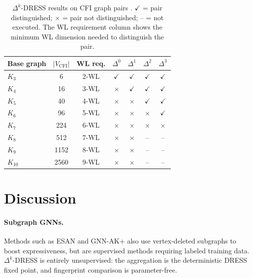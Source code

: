 \documentclass[11pt,a4paper]{article}
\begin{document}
\begin{table}[h]
\centering
\caption{$\Delta^k$-DRESS results on CFI graph pairs \cite{castrillo2026dress}. $\checkmark$ = pair distinguished; $\times$ = pair not distinguished; -- = not executed. The WL requirement column shows the minimum WL dimension needed to distinguish the pair.}
\label{tab:cfi-results}
\begin{tabular}{@{}lcccccc@{}}
\toprule
Base graph & $|V_{\text{CFI}}|$ & WL req. & $\Delta^0$ & $\Delta^1$ & $\Delta^2$ & $\Delta^3$ \\
\midrule
$K_3$   & 6     & 2-WL & $\checkmark$  & $\checkmark$  & $\checkmark$  & $\checkmark$  \\
$K_4$   & 16    & 3-WL & $\times$      & $\checkmark$  & $\checkmark$  & $\checkmark$  \\
$K_5$   & 40    & 4-WL & $\times$      & $\times$      & $\checkmark$  & $\checkmark$  \\
$K_6$   & 96    & 5-WL & $\times$      & $\times$      & $\times$      & $\checkmark$  \\
$K_7$   & 224   & 6-WL & $\times$      & $\times$      & $\times$      & $\times$      \\
$K_8$   & 512   & 7-WL & $\times$      & $\times$      & --            & --            \\
$K_9$   & 1152  & 8-WL & $\times$      & $\times$      & --            & --            \\
$K_{10}$& 2560  & 9-WL & $\times$      & $\times$      & --            & --            \\
\bottomrule
\end{tabular}
\end{table}

\section{Discussion}

\paragraph{Subgraph GNNs.} Methods such as ESAN \cite{bevilacqua2022equivariant} and GNN-AK+ \cite{zhao2022from} also use vertex-deleted subgraphs to boost expressiveness, but are supervised methods requiring labeled training data. $\Delta^k$-DRESS is entirely unsupervised: the aggregation is the deterministic DRESS fixed point, and fingerprint comparison is parameter-free.
\end{document}
